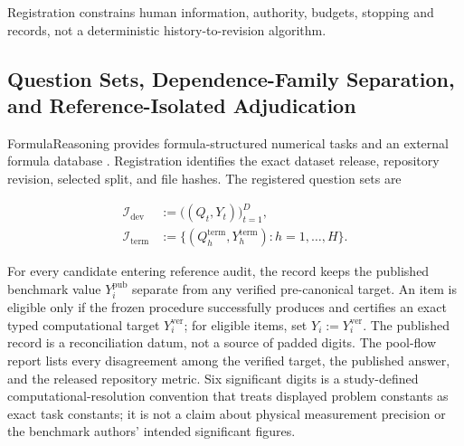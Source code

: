 \documentclass[10pt]{article} %
\providecommand{\1}{\mathbf{1}}  %
\theoremstyle{remark}
\theoremstyle{definition}
\begin{document}
Registration constrains human information, authority, budgets, stopping and
records, not a deterministic history-to-revision algorithm.

\subsection{Question Sets, Dependence-Family Separation, and Reference-Isolated Adjudication}

\label{subsec:pilot-question-sets}

FormulaReasoning provides formula-structured numerical tasks and an external
formula database \citep{li2026formulareasoning}. Registration identifies the
exact dataset release, repository revision, selected split, and file hashes.
The registered question sets are

\begin{align}
\mathcal I_{\mathrm{dev}}
&:=
\bigl((Q_t,Y_t)\bigr)_{t=1}^{D},
\label{eq:pilot-development-stream}\\
\mathcal I_{\mathrm{term}}
&:=
\bigl\{(Q_h^{\mathrm{term}},Y_h^{\mathrm{term}}):h=1,\ldots,H\bigr\}.
\label{eq:pilot-terminal-panel}
\end{align}

For every candidate entering reference audit, the record keeps the published benchmark value $Y_i^{\mathrm{pub}}$ separate from any verified pre-canonical target. An item is eligible only if the frozen procedure successfully produces and certifies an exact typed computational target $Y_i^{\mathrm{ver}}$; for eligible items, set $Y_i:=Y_i^{\mathrm{ver}}$. The published record is a reconciliation datum, not a source of padded digits. The pool-flow report lists every disagreement among the verified target, the published answer, and the released repository metric. Six significant digits is a study-defined computational-resolution convention that treats displayed problem constants as exact task constants; it is not a claim about physical measurement precision or the benchmark authors' intended significant figures.
\end{document}
